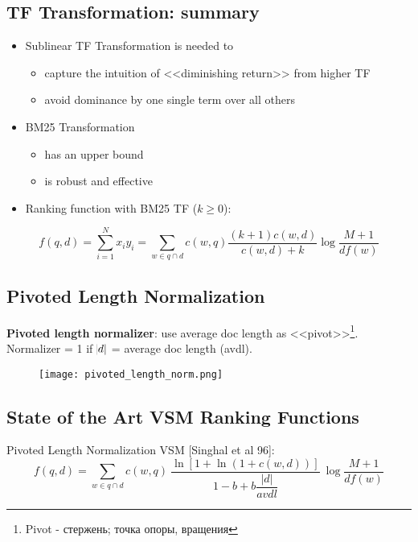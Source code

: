 \subsection{TF Transformation: summary}
\begin{itemize}
\item Sublinear TF Transformation is needed to
\begin{itemize}
\item capture the intuition of <<diminishing return>> from higher TF 
\item avoid dominance by one single term over all others
\end{itemize}

\item BM25 Transformation 
\begin{itemize}
\item has an upper bound
\item is robust and effective
\end{itemize}

\item Ranking function with BM25 TF ($k \geqslant 0$):
\end{itemize}

\begin{equation*}
f(q, d) = \sum_{i=1}^N x_i y_i = \sum_{w \in q \cap d} c(w, q) \frac{(k+1) c(w, d)}{c(w, d) + k} \log \frac{M+1}{df(w)}
\end{equation*}


\subsection{Pivoted Length Normalization}

\textbf{Pivoted length normalizer}: use average doc length as <<pivot>>\footnote{Pivot - стержень; точка опоры, вращения}. Normalizer = 1 if $\abs{d}$ = average doc length (avdl).

\begin{figure}[H]
    \centering
    \texttt{[image: pivoted\_length\_norm.png]}
\end{figure}


\subsection{State of the Art VSM Ranking Functions}

Pivoted Length Normalization VSM [Singhal et al 96]:
\begin{equation*}
f(q, d) = \sum_{w \in q \cap d} c(w, q) \: \frac{\ln[1+\ln(1+c(w, d))]}{1-b+b\dfrac{|d|}{avdl}} \: \log\frac{M+1}{df(w)}
\end{equation*}


